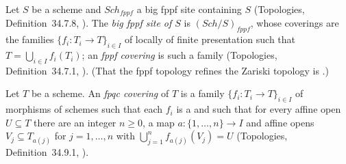 \begin{definition}\label{def:pc-fppf-site}
Let $S$ be a scheme and $\mathit{Sch}_{fppf}$ a big fppf site containing
$S$ (Topologies, Definition~34.7.8,
).  The
\emph{big fppf site of $S$} is $(\mathit{Sch}/S)_{fppf}$, whose coverings
are the families $\{f_i\colon T_i\to T\}_{i\in I}$ of
 locally of finite
presentation such that $T=\bigcup_{i\in I}f_i(T_i)$; an \emph{fppf
covering} is such a family (Topologies, Definition~34.7.1,
).  (That the fppf
topology refines the Zariski topology is .)
\mathlibok\ 
\end{definition}

\begin{definition}\label{def:pc-fpqc-covering}
Let $T$ be a scheme.  An \emph{fpqc covering} of $T$ is a family
$\{f_i\colon T_i\to T\}_{i\in I}$ of morphisms of schemes such that each
$f_i$ is a  and such
that for every affine open $U\subseteq T$ there are an integer $n\ge0$, a
map $a\colon\{1,\dots,n\}\to I$ and affine opens $V_j\subseteq T_{a(j)}$
for $j=1,\dots,n$ with $\bigcup_{j=1}^{n}f_{a(j)}(V_j)=U$ (Topologies,
Definition~34.9.1, ).
\mathlibok\ 
\end{definition}

